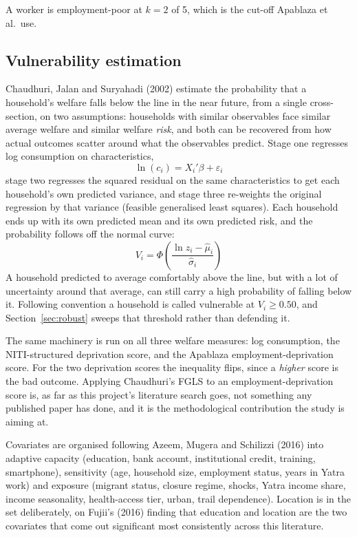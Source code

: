 \documentclass[11pt]{article}
\begin{document}
\noindent A worker is employment-poor at $k = 2$ of 5, which is the cut-off Apablaza et al.\ use.

\subsection{Vulnerability estimation}

Chaudhuri, Jalan and Suryahadi (2002) estimate the probability that a household's welfare
falls below the line in the near future, from a single cross-section, on two assumptions:
households with similar observables face similar average welfare and similar welfare
\emph{risk}, and both can be recovered from how actual outcomes scatter around what the
observables predict. Stage one regresses log consumption on characteristics,
\begin{equation}
\ln(c_i) = X_i'\beta + \varepsilon_i
\end{equation}
stage two regresses the squared residual on the same characteristics to get each household's
own predicted variance, and stage three re-weights the original regression by that variance
(feasible generalised least squares). Each household ends up with its own predicted mean and
its own predicted risk, and the probability follows off the normal curve:
\begin{equation}
V_i = \Phi\!\left( \frac{\ln z_i - \widehat{\mu}_i}{\widehat{\sigma}_i} \right)
\end{equation}
A household predicted to average comfortably above the line, but with a lot of uncertainty
around that average, can still carry a high probability of falling below it. Following
convention a household is called vulnerable at $V_i \geq 0.50$, and Section~\ref{sec:robust}
sweeps that threshold rather than defending it.

The same machinery is run on all three welfare measures: log consumption, the NITI-structured
deprivation score, and the Apablaza employment-deprivation score. For the two deprivation
scores the inequality flips, since a \emph{higher} score is the bad outcome. Applying
Chaudhuri's FGLS to an employment-deprivation score is, as far as this project's literature
search goes, not something any published paper has done, and it is the methodological
contribution the study is aiming at.

Covariates are organised following Azeem, Mugera and Schilizzi (2016) into adaptive capacity
(education, bank account, institutional credit, training, smartphone), sensitivity (age,
household size, employment status, years in Yatra work) and exposure (migrant status, closure
regime, shocks, Yatra income share, income seasonality, health-access tier, urban, trail
dependence). Location is in the set deliberately, on Fujii's (2016) finding that education and
location are the two covariates that come out significant most consistently across this
literature.
\end{document}
